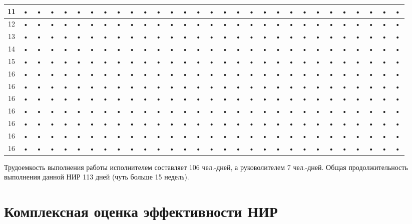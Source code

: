 \begin{landscape}
\begin{longtable}{|c|c|c|c|c|c|c|c|c|c|c|c|c|c|c|c|c|c|c|c|c|c|c|c|c|c|c|c|c|c|}
\hline 
11 & • & • & • & • & • & • & • & • & • & • & • & • & • & • & • & • & • & • & • & • & • & • & • & • & • & • & • & • & • \\
\hline 
12 & • & • & • & • & • & • & • & • & • & • & • & • & • & • & • & • & • & • & • & • & • & • & • & • & • & • & • & • & • \\
\hline 
13 & • & • & • & • & • & • & • & • & • & • & • & • & • & • & • & • & • & • & • & • & • & • & • & • & • & • & • & • & • \\
\hline 
14 & • & • & • & • & • & • & • & • & • & • & • & • & • & • & • & • & • & • & • & • & • & • & • & • & • & • & • & • & • \\
\hline 
15 & • & • & • & • & • & • & • & • & • & • & • & • & • & • & • & • & • & • & • & • & • & • & • & • & • & • & • & • & • \\
\hline 
16 & • & • & • & • & • & • & • & • & • & • & • & • & • & • & • & • & • & • & • & • & • & • & • & • & • & • & • & • & • \\
\hline 
16 & • & • & • & • & • & • & • & • & • & • & • & • & • & • & • & • & • & • & • & • & • & • & • & • & • & • & • & • & • \\
\hline
16 & • & • & • & • & • & • & • & • & • & • & • & • & • & • & • & • & • & • & • & • & • & • & • & • & • & • & • & • & • \\
\hline
16 & • & • & • & • & • & • & • & • & • & • & • & • & • & • & • & • & • & • & • & • & • & • & • & • & • & • & • & • & • \\
\hline
16 & • & • & • & • & • & • & • & • & • & • & • & • & • & • & • & • & • & • & • & • & • & • & • & • & • & • & • & • & • \\
\hline
16 & • & • & • & • & • & • & • & • & • & • & • & • & • & • & • & • & • & • & • & • & • & • & • & • & • & • & • & • & • \\
\hline
16 & • & • & • & • & • & • & • & • & • & • & • & • & • & • & • & • & • & • & • & • & • & • & • & • & • & • & • & • & • \\
\hline
\end{longtable}
\end{landscape}

Трудоемкость выполнения работы исполнителем  составляет 106 чел.-дней, а руковолителем 7 чел.-дней.
Общая продолжительность выполнения данной НИР 113 дней (чуть больше 15 недель).

\section{Комплексная оценка эффективности НИР}

